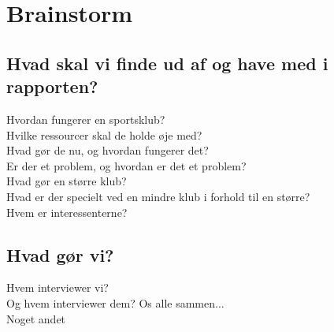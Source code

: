 \chapter{Brainstorm}\label{ch:ch2label}


\section{Hvad skal vi finde ud af og have med i rapporten?}
Hvordan fungerer en sportsklub?\\
Hvilke ressourcer skal de holde øje med?\\
Hvad gør de nu, og hvordan fungerer det?\\
Er der et problem, og hvordan er det et problem?\\
Hvad gør en større klub?\\
Hvad er der specielt ved en mindre klub i forhold til en større?\\
Hvem er interessenterne?\\

\section{Hvad gør vi?}
Hvem interviewer vi?\\
Og hvem interviewer dem? Os alle sammen...\\
Noget andet\\

















